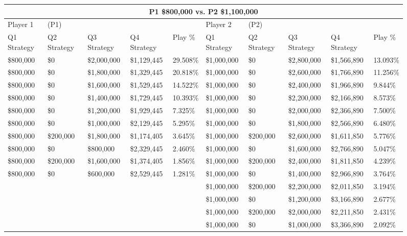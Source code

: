 \documentclass[11pt]{article}
\begin{document}
\begin{figure}
\tiny
\begin{tabular}{ |p{1.0cm}p{1.0cm}p{1.0cm}p{2.0cm}|p{1.0cm}||p{1.0cm}p{1.0cm}p{1.0cm}p{2.0cm}|p{1.0cm}|}
\hline
\multicolumn{10}{|c|}{P1 \$800,000 vs. P2 \$1,100,000} \\
\hline
Player 1 & (P1) & & & & Player 2 & (P2) & & & \\
\hline
Q1 Strategy & Q2 Strategy & Q3 Strategy & Q4 Strategy  &  Play \% & Q1 Strategy & Q2 Strategy & Q3 Strategy & Q4 Strategy  &  Play \%\\
\hline
\$800,000 & \$0 & \$2,000,000 & \$1,129,445 & 29.508\% & \$1,000,000 & \$0 & \$2,800,000 & \$1,566,890 & 13.093\% \\
\$800,000 & \$0 & \$1,800,000 & \$1,329,445 & 20.818\% & \$1,000,000 & \$0 & \$2,600,000 & \$1,766,890 & 11.256\% \\
\$800,000 & \$0 & \$1,600,000 & \$1,529,445 & 14.522\% & \$1,000,000 & \$0 & \$2,400,000 & \$1,966,890 & 9.844\% \\
\$800,000 & \$0 & \$1,400,000 & \$1,729,445 & 10.393\% & \$1,000,000 & \$0 & \$2,200,000 & \$2,166,890 & 8.573\% \\
\$800,000 & \$0 & \$1,200,000 & \$1,929,445 & 7.325\% & \$1,000,000 & \$0 & \$2,000,000 & \$2,366,890 & 7.500\% \\
\$800,000 & \$0 & \$1,000,000 & \$2,129,445 & 5.295\% & \$1,000,000 & \$0 & \$1,800,000 & \$2,566,890 & 6.480\% \\
\$800,000 & \$200,000 & \$1,800,000 & \$1,174,405 & 3.645\% & \$1,000,000 & \$200,000 & \$2,600,000 & \$1,611,850 & 5.776\% \\
\$800,000 & \$0 & \$800,000 & \$2,329,445 & 2.460\% & \$1,000,000 & \$0 & \$1,600,000 & \$2,766,890 & 5.047\% \\
\$800,000 & \$200,000 & \$1,600,000 & \$1,374,405 & 1.856\% & \$1,000,000 & \$200,000 & \$2,400,000 & \$1,811,850 & 4.239\% \\
\$800,000 & \$0 & \$600,000 & \$2,529,445 & 1.281\% & \$1,000,000 & \$0 & \$1,400,000 & \$2,966,890 & 3.764\% \\
&  &  &  &  & \$1,000,000 & \$200,000 & \$2,200,000 & \$2,011,850 & 3.194\% \\
&  &  &  &  & \$1,000,000 & \$0 & \$1,200,000 & \$3,166,890 & 2.677\% \\
&  &  &  &  & \$1,000,000 & \$200,000 & \$2,000,000 & \$2,211,850 & 2.431\% \\
&  &  &  &  & \$1,000,000 & \$0 & \$1,000,000 & \$3,366,890 & 2.092\% \\

\end{tabular}
\end{figure}
\end{document}
